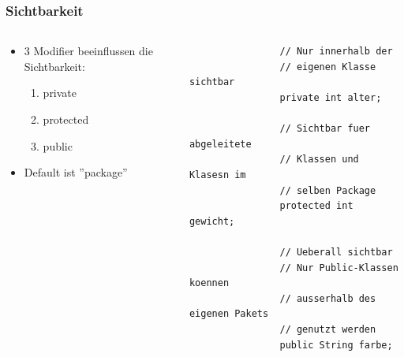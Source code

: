 \begin{frame}[fragile]
	  \frametitle{Sichtbarkeit}
		 \begin{columns}
		 \begin{column}{0.5\textwidth}
			  \small
			  \begin{itemize}
			    \item 3 Modifier beeinflussen die Sichtbarkeit:
			  	\begin{enumerate}
			  	  \item private
			  	  \item protected
			  	  \item public
			  	\end{enumerate}
			  	\item Default ist ''package''
			  \end{itemize}
		 \end{column}
		 \begin{column}{0.5\textwidth}
		 	\begin{lstlisting}
		 		// Nur innerhalb der 
		 		// eigenen Klasse sichtbar
		 		private int alter;
		 		
		 		// Sichtbar fuer abgeleitete
		 		// Klassen und Klasesn im 
		 		// selben Package
		 		protected int gewicht;
		 		
		 		// Ueberall sichtbar
		 		// Nur Public-Klassen koennen
		 		// ausserhalb des eigenen Pakets
		 		// genutzt werden
		 		public String farbe;
		 	\end{lstlisting}
		 \end{column}
		 \end{columns}
\end{frame}

